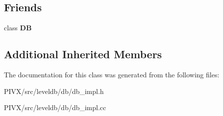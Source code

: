 \subsection*{Friends}
\begin{DoxyCompactItemize}
\item 
\mbox{\label{classleveldb_1_1_d_b_impl_ad22eb7a23cbf34de526efa966c578d4a}} 
class {\bfseries DB}
\end{DoxyCompactItemize}
\subsection*{Additional Inherited Members}


The documentation for this class was generated from the following files\+:\begin{DoxyCompactItemize}
\item 
P\+I\+V\+X/src/leveldb/db/db\+\_\+impl.\+h\item 
P\+I\+V\+X/src/leveldb/db/db\+\_\+impl.\+cc\end{DoxyCompactItemize}

